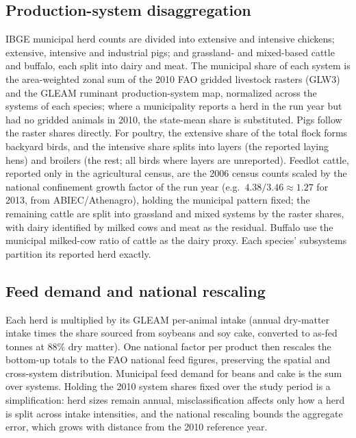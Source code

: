 \documentclass[pdflatex,sn-nature]{sn-jnl}%
\begin{document}
\subsection{Production-system disaggregation}
IBGE municipal herd counts are divided into extensive and intensive
chickens; extensive, intensive and industrial pigs; and grassland- and
mixed-based cattle and buffalo, each split into dairy and meat. The
municipal share of each system is the area-weighted zonal sum of the
2010 FAO gridded livestock rasters (GLW3) and the GLEAM ruminant
production-system map, normalized across the systems of each species;
where a municipality reports a herd in the run year but had no gridded
animals in 2010, the state-mean share is substituted. Pigs follow the
raster shares directly. For poultry, the extensive share of the total
flock forms backyard birds, and the intensive share splits into layers
(the reported laying hens) and broilers (the rest; all birds where
layers are unreported). Feedlot cattle, reported only in the
agricultural census, are the 2006 census counts scaled by the national
confinement growth factor of the run year (e.g.\
$4.38/3.46\approx1.27$ for 2013, from ABIEC/Athenagro), holding the
municipal pattern fixed; the remaining cattle are split into grassland
and mixed systems by the raster shares, with dairy identified by
milked cows and meat as the residual. Buffalo use the municipal
milked-cow ratio of cattle as the dairy proxy. Each species'
subsystems partition its reported herd exactly.

\subsection{Feed demand and national rescaling}
Each herd is multiplied by its GLEAM per-animal intake (annual dry-matter
intake times the share sourced from soybeans and soy cake, converted to
as-fed tonnes at 88\% dry matter). One national factor per product then
rescales the bottom-up totals to the FAO national feed figures,
preserving the spatial and cross-system distribution.
Municipal feed demand for beans and cake is the sum over systems. Holding
the 2010 system shares fixed over the study period is a simplification:
herd sizes remain annual, misclassification affects only how a herd is
split across intake intensities, and the national rescaling bounds the
aggregate error, which grows with distance from the 2010 reference year.

\end{document}
